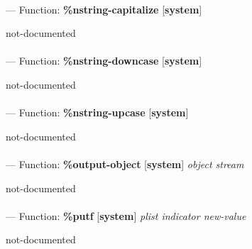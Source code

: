 \paragraph{}
\label{SYSTEM:NSTRING-CAPITALIZE}
--- Function: \textbf{\%nstring-capitalize} [\textbf{system}] \textit{}

\begin{adjustwidth}{5em}{5em}
not-documented
\end{adjustwidth}

\paragraph{}
\label{SYSTEM:NSTRING-DOWNCASE}
--- Function: \textbf{\%nstring-downcase} [\textbf{system}] \textit{}

\begin{adjustwidth}{5em}{5em}
not-documented
\end{adjustwidth}

\paragraph{}
\label{SYSTEM:NSTRING-UPCASE}
--- Function: \textbf{\%nstring-upcase} [\textbf{system}] \textit{}

\begin{adjustwidth}{5em}{5em}
not-documented
\end{adjustwidth}

\paragraph{}
\label{SYSTEM:OUTPUT-OBJECT}
--- Function: \textbf{\%output-object} [\textbf{system}] \textit{object stream}

\begin{adjustwidth}{5em}{5em}
not-documented
\end{adjustwidth}

\paragraph{}
\label{SYSTEM:PUTF}
--- Function: \textbf{\%putf} [\textbf{system}] \textit{plist indicator new-value}

\begin{adjustwidth}{5em}{5em}
not-documented
\end{adjustwidth}

